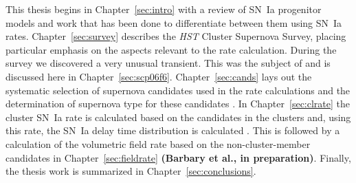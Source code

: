 This thesis begins in Chapter~\ref{sec:intro} with a review of SN~Ia
progenitor models and work that has been done to differentiate between
them using SN~Ia rates. Chapter~\ref{sec:survey} describes the
\emph{HST} Cluster Supernova Survey, placing particular emphasis 
on the aspects relevant to the rate calculation. During the survey we
discovered a very unusual transient. This was the subject of
{\bf \citet{barbary09a}} and is discussed here in
Chapter~\ref{sec:scp06f6}. Chapter~\ref{sec:cands} lays out the
systematic selection of supernova candidates used in the rate
calculations and the determination of supernova type for these
candidates {\bf \citep[first part of][]{barbary11a}}.  In
Chapter~\ref{sec:clrate} the cluster SN~Ia rate is calculated based on
the candidates in the clusters and, using this rate, the SN~Ia delay
time distribution is calculated {\bf \citep[second part
of][]{barbary11a}}. This is followed by a calculation of the
volumetric field rate based on the non-cluster-member candidates in
Chapter~\ref{sec:fieldrate} {\bf (Barbary et al., in preparation)}.
Finally, the thesis work is summarized in Chapter~\ref{sec:conclusions}.
